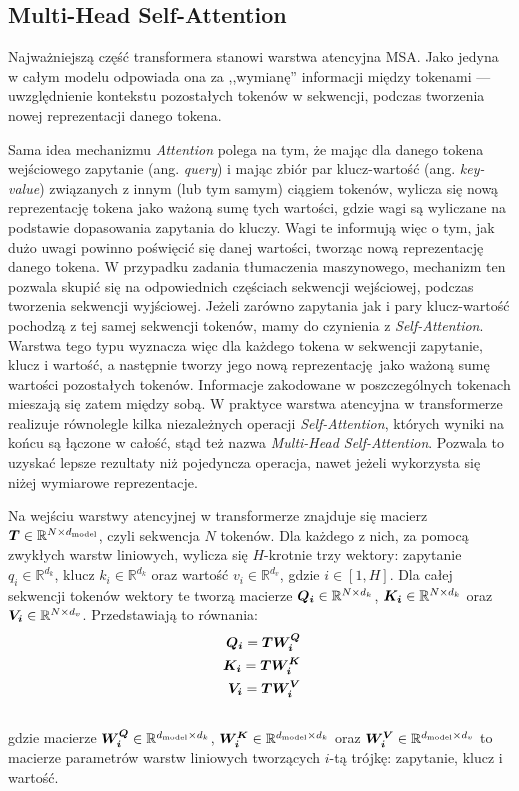 \subsection{Multi-Head Self-Attention}

Najważniejszą część transformera stanowi warstwa atencyjna MSA. Jako jedyna w całym modelu
odpowiada ona za ,,wymianę'' informacji między tokenami --- uwzględnienie kontekstu pozostałych
tokenów w sekwencji, podczas tworzenia nowej reprezentacji danego tokena.

Sama idea mechanizmu \emph{Attention} polega na tym, że mając dla danego tokena wejściowego
zapytanie (ang. \emph{query}) i mając zbiór par klucz-wartość (ang. \emph{key-value}) związanych z
innym (lub tym samym) ciągiem tokenów, wylicza się nową reprezentację tokena jako ważoną sumę tych
wartości, gdzie wagi są wyliczane na podstawie dopasowania zapytania do kluczy. Wagi te informują
więc o tym, jak dużo uwagi powinno poświęcić się danej wartości, tworząc nową reprezentację danego
tokena. W przypadku zadania tłumaczenia maszynowego, mechanizm ten pozwala skupić się na
odpowiednich częściach sekwencji wejściowej, podczas tworzenia sekwencji wyjściowej. Jeżeli zarówno
zapytania jak i pary klucz-wartość pochodzą z tej samej sekwencji tokenów, mamy do czynienia z
\emph{Self-Attention}. Warstwa tego typu wyznacza więc dla każdego tokena w sekwencji zapytanie,
klucz i wartość, a następnie tworzy jego nową reprezentację jako ważoną sumę wartości pozostałych
tokenów. Informacje zakodowane w poszczególnych tokenach mieszają się zatem między sobą. W praktyce
warstwa atencyjna w transformerze realizuje równolegle kilka niezależnych operacji
\emph{Self-Attention}, których wyniki na końcu są łączone w całość, stąd też nazwa \emph{Multi-Head
Self-Attention}. Pozwala to uzyskać lepsze rezultaty niż pojedyncza operacja, nawet jeżeli
wykorzysta się niżej wymiarowe reprezentacje.

Na wejściu warstwy atencyjnej w transformerze znajduje się macierz
$\boldsymbol{T} \in \mathbb{R}^{N \times d_{\mathrm{model}}}$, czyli sekwencja $N$ tokenów. Dla każdego z nich, za pomocą
zwykłych warstw liniowych, wylicza się $H$-krotnie trzy wektory: zapytanie $q_i \in
\mathbb{R}^{d_k}$, klucz $k_i \in \mathbb{R}^{d_k}$ oraz wartość $v_i \in \mathbb{R}^{d_v}$, gdzie
$i \in [1, H]$. Dla całej sekwencji tokenów wektory te tworzą macierze $\boldsymbol{Q_i} \in \mathbb{R}^{N \times d_k}$,
$\boldsymbol{K_i} \in \mathbb{R}^{N \times d_k}$ oraz $\boldsymbol{V_i} \in \mathbb{R}^{N \times d_v}$. Przedstawiają to równania:
\begin{eqnarray}
    \boldsymbol{Q_i} = \boldsymbol{T} \boldsymbol{W_i^Q} \\\
    \boldsymbol{K_i} = \boldsymbol{T} \boldsymbol{W_i^K} \\\
    \boldsymbol{V_i} = \boldsymbol{T} \boldsymbol{W_i^V} \\\
\end{eqnarray}
gdzie macierze $\boldsymbol{W_i^Q} \in \mathbb{R}^{d_{\mathrm{model}} \times d_k}$,
$\boldsymbol{W_i^K} \in \mathbb{R}^{d_{\mathrm{model}} \times d_k}$ oraz $\boldsymbol{W_i^V} \in \mathbb{R}^{d_{\mathrm{model}} \times d_v}$ to
macierze parametrów warstw liniowych tworzących $i$-tą trójkę: zapytanie, klucz i wartość.

